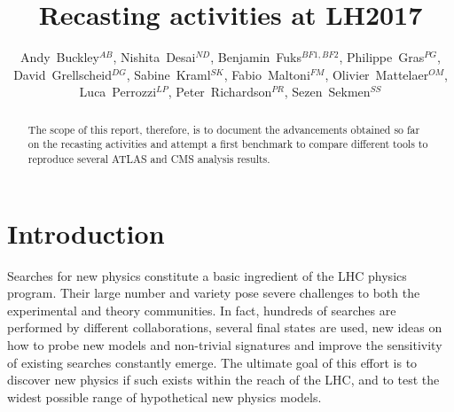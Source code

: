 \documentclass[11pt]{cernrep}
\begin{document}
\setlength\parindent{0pt}

\title{Recasting activities at LH2017}

\author{
Andy~Buckley$^{AB}$, 
Nishita~Desai$^{ND}$,
Benjamin~Fuks$^{BF1,BF2}$,
Philippe~Gras$^{PG}$, 
David~Grellscheid$^{DG}$,
Sabine~Kraml$^{SK}$,
Fabio~Maltoni$^{FM}$,
Olivier~Mattelaer$^{OM}$,
Luca~Perrozzi$^{LP}$,
Peter~Richardson$^{PR}$,
Sezen~Sekmen$^{SS}$
}


\maketitle

\begin{abstract}
The scope of this report, therefore, is to document the advancements obtained so far on the recasting
activities and attempt a first benchmark to compare different tools to reproduce several ATLAS and
CMS analysis results.
\end{abstract}

\section{Introduction}

Searches for new physics constitute a basic ingredient of the LHC physics program.
Their large number and variety pose severe challenges to both the experimental and theory communities.
In fact, hundreds of searches are performed by different collaborations, several final states are used,
new ideas on how to probe new models and non-trivial signatures and improve the sensitivity of existing searches constantly emerge.
The ultimate goal of this effort is to discover new physics if such
exists within the reach of the LHC, and to test the widest possible range of hypothetical new physics models.
\end{document}
